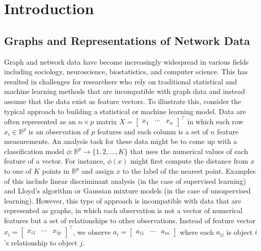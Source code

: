\documentclass[
  11pt,
]{article}
\begin{document}
\hypertarget{introduction}{%
\section{Introduction}\label{introduction}}

\hypertarget{graphs-and-representations-of-network-data}{%
\subsection{Graphs and Representations of Network
Data}\label{graphs-and-representations-of-network-data}}

Graph and network data have become increasingly widespread in various
fields including sociology, neuroscience, biostatistics, and computer
science. This has resulted in challenges for researchers who rely on
traditional statistical and machine learning methods that are
incompatible with graph data and instead assume that the data exist as
feature vectors. To illustrate this, consider the typical approach to
building a statistical or machine learning model. Data are often
represented as an \(n \times p\) matrix
\(X = \begin{bmatrix} x_1 & \cdots & x_n \end{bmatrix}^\top\) in which
each row \(x_i \in \mathbb{R}^p\) is an observation of \(p\) features
and each column is a set of \(n\) feature measurements. An analysis task
for these data might be to come up with a classification model
\(\phi : \mathbb{R}^p \to \{1, 2, ..., K\}\) that uses the numerical
values of each feature of a vector. For instance, \(\phi(x)\) might
first compute the distance from \(x\) to one of \(K\) points in
\(\mathbb{R}^p\) and assign \(x\) to the label of the nearest point.
Examples of this include linear discriminant analysis (in the case of
supervised learning) and Lloyd's algorithm or Gaussian mixture models
(in the case of unsupervised learning). However, this type of approach
is incompatible with data that are represented as graphs, in which each
observation is not a vector of numerical features but a set of
relationships to other observations. Instead of feature vector
\(x_i = \begin{bmatrix} x_{i1} & \cdots & x_{ip} \end{bmatrix}^\top\),
we observe
\(a_i = \begin{bmatrix} a_{i1} & \cdots & a_{in} \end{bmatrix}\) where
each \(a_{ij}\) is object \(i\)'s relationship to object \(j\).
\end{document}
